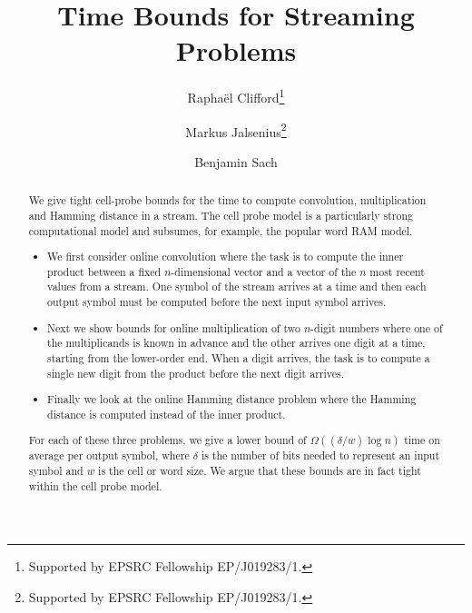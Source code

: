 \documentclass{toc}
\begin{document}
\begin{frontmatter}[classification=text]
%
\title{Time Bounds for Streaming Problems}

%
%
%
%
%
%
%
%
%
%
%
%
%
%
%
%


%
%
%
\author[clifford]{Rapha\"el Clifford\thanks{Supported by EPSRC Fellowship EP/J019283/1.}}
\author[jalsenius]{Markus Jalsenius\thanks{Supported by EPSRC Fellowship EP/J019283/1.}}
\author[sach]{Benjamin Sach}
%
%
%
%

%
\begin{abstract}
We give tight cell-probe bounds for the time to compute convolution, multiplication and Hamming distance in a stream. The cell probe model is a particularly strong computational model and subsumes, for example, the popular word RAM model.
\begin{itemize}
\item We first consider online convolution where the task is to
%
compute   %
the inner product between a fixed $n$-dimensional vector and a vector
of the $n$ most recent values from a stream. One symbol of the stream
arrives at a time and then each output
symbol  %
must be computed before the next
%
input symbol   %
arrives.

\item Next we show bounds for online multiplication of two $n$-digit numbers where one of the multiplicands is known in advance and the other arrives one digit at a time, starting from the lower-order end.
When a digit arrives, the task is to compute a single new digit from the product before the next digit arrives.

\item Finally we look at the online Hamming distance problem
where the Hamming distance is
%
computed     %
instead of the inner product. 
	
\end{itemize}

For each of these three problems, we give a lower bound of
$\Omega\left(({\delta}/{w})\log n\right)$ time on average
%
per output symbol,   %
where $\delta$ is the number of bits needed to represent an input symbol
and $w$ is the cell or word size. We argue that these
%
bounds    %
are in fact tight within the cell probe model. 
\end{abstract}

%
\end{frontmatter}
\end{document}
